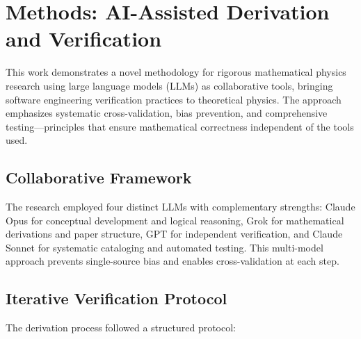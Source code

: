 \section{Methods: AI-Assisted Derivation and Verification}

This work demonstrates a novel methodology for rigorous mathematical physics research using large language models (LLMs) as collaborative tools, bringing software engineering verification practices to theoretical physics. The approach emphasizes systematic cross-validation, bias prevention, and comprehensive testing—principles that ensure mathematical correctness independent of the tools used.

\subsection{Collaborative Framework}
The research employed four distinct LLMs with complementary strengths: Claude Opus for conceptual development and logical reasoning, Grok for mathematical derivations and paper structure, GPT for independent verification, and Claude Sonnet for systematic cataloging and automated testing. This multi-model approach prevents single-source bias and enables cross-validation at each step.

\subsection{Iterative Verification Protocol}
The derivation process followed a structured protocol:

